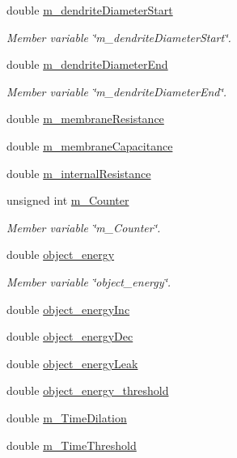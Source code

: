 \begin{DoxyCompactItemize}
double \mbox{\hyperlink{classDendrite_a0911f9623a3aa5b932d47a702730752e}{m\+\_\+dendrite\+Diameter\+Start}}
\begin{DoxyCompactList}\small\item\em Member variable \char`\"{}m\+\_\+dendrite\+Diameter\+Start\char`\"{}. \end{DoxyCompactList}\item 
double \mbox{\hyperlink{classDendrite_ac3a465f1f142ba87c24c4794292d1a22}{m\+\_\+dendrite\+Diameter\+End}}
\begin{DoxyCompactList}\small\item\em Member variable \char`\"{}m\+\_\+dendrite\+Diameter\+End\char`\"{}. \end{DoxyCompactList}\item 
double \mbox{\hyperlink{classDendrite_a3d0107ad2ad6bccb14eaca4e2e118bbc}{m\+\_\+membrane\+Resistance}}
\item 
double \mbox{\hyperlink{classDendrite_aa8e9e9e5defcd99e0793bc4d1e8f3615}{m\+\_\+membrane\+Capacitance}}
\item 
double \mbox{\hyperlink{classDendrite_ae76ec62f0f14fca81d4e217002e1a631}{m\+\_\+internal\+Resistance}}
\item 
unsigned int \mbox{\hyperlink{classDendrite_a7cab5c65468ff1c45b13b172028c2209}{m\+\_\+\+Counter}}
\begin{DoxyCompactList}\small\item\em Member variable \char`\"{}m\+\_\+\+Counter\char`\"{}. \end{DoxyCompactList}\item 
double \mbox{\hyperlink{classDendrite_a88f9b4ed19218a666001e722561c6cc3}{object\+\_\+energy}}
\begin{DoxyCompactList}\small\item\em Member variable \char`\"{}object\+\_\+energy\char`\"{}. \end{DoxyCompactList}\item 
double \mbox{\hyperlink{classDendrite_a3983ac62d34b1c5bd050f0b1cfeb5855}{object\+\_\+energy\+Inc}}
\item 
double \mbox{\hyperlink{classDendrite_a1d1292149a68340a586c2da6c5de82aa}{object\+\_\+energy\+Dec}}
\item 
double \mbox{\hyperlink{classDendrite_a4dea4d8ed2606f612b96203ef88a52c9}{object\+\_\+energy\+Leak}}
\item 
double \mbox{\hyperlink{classDendrite_a29d0f83fef3ff623132ee1faf9221c35}{object\+\_\+energy\+\_\+threshold}}
\item 
double \mbox{\hyperlink{classDendrite_a18fe1c4fb9bf220176d30e163ccfa71b}{m\+\_\+\+Time\+Dilation}}
\item 
double \mbox{\hyperlink{classDendrite_a9e1fa8355d6d05913113df4cb6f0e825}{m\+\_\+\+Time\+Threshold}}
\end{DoxyCompactItemize}
